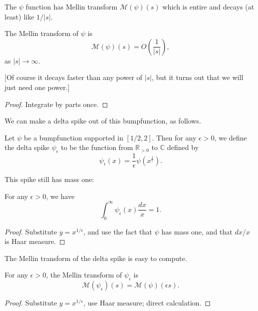 The $\psi$ function has Mellin transform $\mathcal{M}(\psi)(s)$ which is entire and decays (at least) like $1/|s|$.
\begin{theorem}\label{MellinOfPsi}
The Mellin transform of $\psi$ is
$$\mathcal{M}(\psi)(s) =  O\left(\frac{1}{|s|}\right),$$
as $|s|\to\infty$.
\end{theorem}

[Of course it decays faster than any power of $|s|$, but it turns out that we will just need one power.]



\begin{proof}
Integrate by parts once.
\end{proof}



We can make a delta spike out of this bumpfunction, as follows.
\begin{definition}\label{DeltaSpike}
Let $\psi$ be a bumpfunction supported in $[1/2,2]$. Then for any $\epsilon>0$, we define the delta spike $\psi_\epsilon$ to be the function from $\mathbb{R}_{>0}$ to $\mathbb{C}$ defined by
$$\psi_\epsilon(x) = \frac{1}{\epsilon}\psi\left(x^{\frac{1}{\epsilon}}\right).$$
\end{definition}

This spike still has mass one:
\begin{lemma}\label{DeltaSpikeMass}
For any $\epsilon>0$, we have
$$\int_0^\infty \psi_\epsilon(x)\frac{dx}{x} = 1.$$
\end{lemma}



\begin{proof}
Substitute $y=x^{1/\epsilon}$, and use the fact that $\psi$ has mass one, and that $dx/x$ is Haar measure.
\end{proof}



The Mellin transform of the delta spike is easy to compute.
\begin{theorem}\label{MellinOfDeltaSpike}
For any $\epsilon>0$, the Mellin transform of $\psi_\epsilon$ is
$$\mathcal{M}(\psi_\epsilon)(s) = \mathcal{M}(\psi)\left(\epsilon s\right).$$
\end{theorem}



\begin{proof}
Substitute $y=x^{1/\epsilon}$, use Haar measure; direct calculation.
\end{proof}



